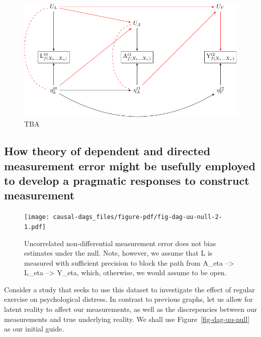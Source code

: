 \documentclass[
  singlecolumn]{report}
\begin{document}
\begin{figure}

{\centering \includegraphics[width=1\textwidth,height=\textheight]{causal-dags_files/figure-pdf/fig-dag-dep-udir-effect-confounders-3wave-1.pdf}

}

\caption{\label{fig-dag-dep-udir-effect-confounders-3wave}TBA}

\end{figure}

\hypertarget{how-theory-of-dependent-and-directed-measurement-error-might-be-usefully-employed-to-develop-a-pragmatic-responses-to-construct-measurement}{%
\subsection{How theory of dependent and directed measurement error might
be usefully employed to develop a pragmatic responses to construct
measurement}\label{how-theory-of-dependent-and-directed-measurement-error-might-be-usefully-employed-to-develop-a-pragmatic-responses-to-construct-measurement}}

\begin{figure}

{\centering \texttt{[image: causal-dags\_files/figure-pdf/fig-dag-uu-null-2-1.pdf]}

}

\caption{\label{fig-dag-uu-null-2}Uncorrelated non-differential
measurement error does not bias estimates under the null. Note, however,
we assume that L is measured with sufficient precision to block the path
from A\_eta --\textgreater{} L\_eta --\textgreater{} Y\_eta, which,
otherwise, we would assume to be open.}

\end{figure}

Consider a study that seeks to use this dataset to investigate the
effect of regular exercise on psychological distress. In contrast to
previous graphs, let us allow for latent reality to affect our
measurements, as well as the discrepencies between our measurements and
true underlying reality. We shall use Figure~\ref{fig-dag-uu-null} as
our initial guide.
\end{document}
